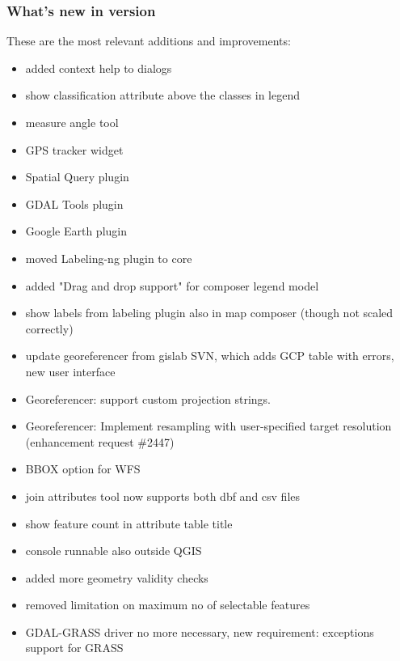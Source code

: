 \subsubsection{What's new in version \CURRENT} 

These are the most relevant additions and improvements:
\begin{itemize}[label=--]
 \item added context help to dialogs
 \item show classification attribute above the classes in legend %
 \item measure angle tool
 \item GPS tracker widget
 \item Spatial Query plugin
 \item GDAL Tools plugin
 \item Google Earth plugin
 \item moved Labeling-ng plugin to core
 \item added "Drag and drop support" for composer legend model
 \item show labels from labeling plugin also in map composer (though not scaled correctly)
 \item update georeferencer from gislab SVN, which adds GCP table with errors, new user interface
 \item Georeferencer: support custom projection strings.
 \item Georeferencer: Implement resampling with user-specified target resolution (enhancement request \#2447)
 \item BBOX option for WFS 
 \item join attributes tool now supports both dbf and csv files %
 \item show feature count in attribute table title
 \item console runnable also outside QGIS
 \item added more geometry validity checks
 \item removed limitation on maximum no of selectable features
 \item GDAL-GRASS driver no more necessary, new requirement: exceptions support for GRASS

\end{itemize}
